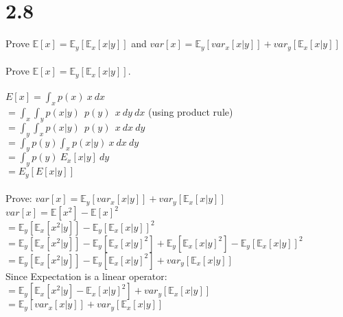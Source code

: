 \documentclass[11pt,leqno,fleqn]{article}
\begin{document}
\section{2.8} Prove $\mathbb{E}[x] = \mathbb{E}_y[\mathbb{E}_x[x|y]]$ and $var[x] = \mathbb{E}_y[var_x[x|y]] + var_y[\mathbb{E}_x[x|y]] $\\
\\
 Prove $\mathbb{E}[x] = \mathbb{E}_y[\mathbb{E}_x[x|y]]$.\\
 \\
 $E[x] = \int_x p(x) \ x \ dx $\\
 $= \int_x \int_y  p(x|y) \ \ p(y) \ \ x \ dy \ dx $ (using product rule)\\
$ = \int_y \int_x  p(x|y) \ \ p(y) \ \ x \ dx \ dy $\\ %
$= \int_ y p(y) \int_x  p(x|y) \ x \ dx \ dy $\\
$ = \int_ y p(y) \  E_x[x|y] \ dy $\\
$ = E_y[E[x|y]] $\\
\\
Prove: $var[x] = \mathbb{E}_y[var_x[x|y]] + var_y[\mathbb{E}_x[x|y]] $\\
$ var[x] =  \mathbb{E}[x^2] - \mathbb{E}[x]^2$\\
$=  \mathbb{E}_y[\mathbb{E}_x[x^2|y]] -  \mathbb{E}_y[\mathbb{E}_x[x|y]]^2$\\
$=  \mathbb{E}_y[\mathbb{E}_x[x^2|y]]  -  \mathbb{E}_y[\mathbb{E}_x[x|y]^2] +  \mathbb{E}_y[\mathbb{E}_x[x|y]^2] - \mathbb{E}_y[\mathbb{E}_x[x|y]]^2 $\\
$=  \mathbb{E}_y[\mathbb{E}_x[x^2|y]]  -  \mathbb{E}_y[\mathbb{E}_x[x|y]^2] + var_y[\mathbb{E}_x[x|y]] $\\
Since Expectation is a linear operator:\\
$=  \mathbb{E}_y[\mathbb{E}_x[x^2|y]  -  \mathbb{E}_x[x|y]^2]  + var_y[\mathbb{E}_x[x|y]] $\\
$=  \mathbb{E}_y[var_x[x|y]]  + var_y[\mathbb{E}_x[x|y]] $\\
\end{document}
